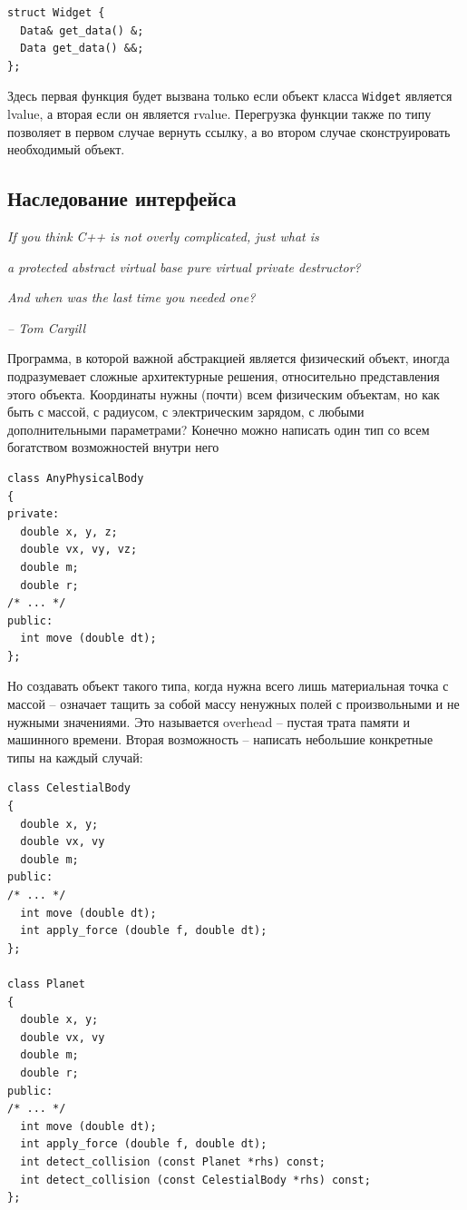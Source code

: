 \documentclass[a4paper,12pt,oneside]{article}
\begin{document}
\begin{lstlisting}
struct Widget {
  Data& get_data() &;
  Data get_data() &&;
};
\end{lstlisting}

Здесь первая функция будет вызвана только если объект класса \lstinline!Widget! является lvalue, а вторая если он является rvalue. Перегрузка функции также по типу позволяет в первом случае вернуть ссылку, а во втором случае сконструировать необходимый объект.

\pagebreak
\subsection{Наследование интерфейса}\label{IntfInheritance}

\hfill\textit{If you think C++ is not overly complicated, just what is} 

\hfill\textit{a protected abstract virtual base pure virtual private destructor?}

\hfill\textit{And when was the last time you needed one?}{\vspace{0.5em}}

\hfill\textit{-- Tom Cargill}

Программа, в которой важной абстракцией является физический объект, иногда подразумевает сложные архитектурные решения, относительно представления этого объекта. Координаты нужны (почти) всем физическим объектам, но как быть с массой, с радиусом, с электрическим зарядом, с любыми дополнительными параметрами? Конечно можно написать один тип со всем богатством возможностей внутри него

\begin{lstlisting}
class AnyPhysicalBody
{
private:
  double x, y, z;
  double vx, vy, vz;
  double m;
  double r;
/* ... */
public:
  int move (double dt);
};
\end{lstlisting}

Но создавать объект такого типа, когда нужна всего лишь материальная точка с массой -- означает тащить за собой массу ненужных полей с произвольными и не нужными значениями. Это называется overhead -- пустая трата памяти и машинного времени. Вторая возможность -- написать небольшие конкретные типы на каждый случай:

\begin{lstlisting}
class CelestialBody
{
  double x, y;
  double vx, vy
  double m;
public:
/* ... */
  int move (double dt);
  int apply_force (double f, double dt);
};

class Planet
{
  double x, y;
  double vx, vy
  double m;
  double r;
public:
/* ... */
  int move (double dt);
  int apply_force (double f, double dt);
  int detect_collision (const Planet *rhs) const;
  int detect_collision (const CelestialBody *rhs) const;
};
\end{lstlisting}
\end{document}
